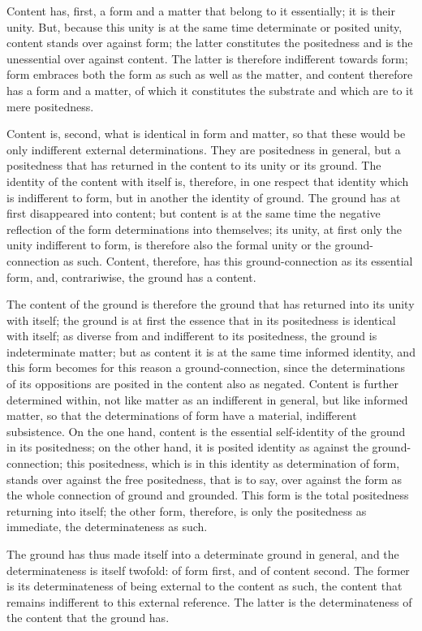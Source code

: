 Content has, first, a form and a matter that
belong to it essentially; it is their unity.
But, because this unity is at the same time determinate
or posited unity, content stands over against form;
the latter constitutes the positedness
and is the unessential over against content.
The latter is therefore indifferent towards form;
form embraces both the form as such as well as the matter,
and content therefore has a form and a matter,
of which it constitutes the substrate
and which are to it mere positedness.

Content is, second, what is identical in form and matter,
so that these would be only indifferent external determinations.
They are positedness in general, but a positedness
that has returned in the content to its unity or its ground.
The identity of the content with itself is,
therefore, in one respect that identity which is indifferent to form,
but in another the identity of ground.
The ground has at first disappeared into content;
but content is at the same time the negative reflection of
the form determinations into themselves;
its unity, at first only the unity indifferent to form, is
therefore also the formal unity or the ground-connection as such.
Content, therefore, has this ground-connection as its essential form,
and, contrariwise, the ground has a content.

The content of the ground is therefore the ground
that has returned into its unity with itself;
the ground is at first the essence that in its
positedness is identical with itself;
as diverse from and indifferent to its positedness,
the ground is indeterminate matter;
but as content it is at the same time informed identity,
and this form becomes for this reason a ground-connection,
since the determinations of its oppositions are posited
in the content also as negated.
Content is further determined within,
not like matter as an indifferent in general,
but like informed matter,
so that the determinations of form have
a material, indifferent subsistence.
On the one hand, content is the essential self-identity
of the ground in its positedness;
on the other hand, it is posited identity
as against the ground-connection;
this positedness, which is in this identity as determination of form,
stands over against the free positedness, that is to say,
over against the form as the whole connection of ground and grounded.
This form is the total positedness returning into itself;
the other form, therefore, is only the positedness as immediate,
the determinateness as such.

The ground has thus made itself into a determinate ground in general,
and the determinateness is itself twofold:
of form first, and of content second.
The former is its determinateness of being external to the content as such,
the content that remains indifferent to this external reference.
The latter is the determinateness of the content that the ground has.

